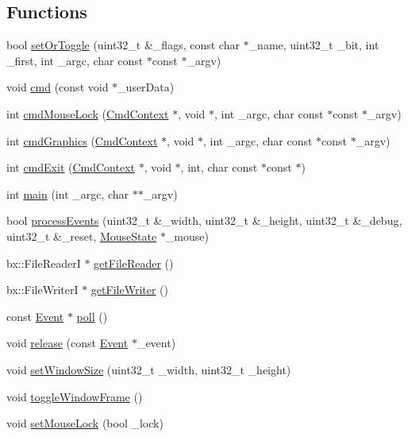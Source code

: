 \subsection*{Functions}
\begin{DoxyCompactItemize}
\item 
bool \hyperlink{namespaceentry_a64e500cbc02e0652e1c492d4eae7d2a2}{set\+Or\+Toggle} (uint32\+\_\+t \&\+\_\+flags, const char $\ast$\+\_\+name, uint32\+\_\+t \+\_\+bit, int \+\_\+first, int \+\_\+argc, char const $\ast$const $\ast$\+\_\+argv)
\item 
void \hyperlink{namespaceentry_af22e216eea3d98ca19a81c42687eee31}{cmd} (const void $\ast$\+\_\+user\+Data)
\item 
int \hyperlink{namespaceentry_a0ebf6dc9ef91f487ad56d260d0a3c5fb}{cmd\+Mouse\+Lock} (\hyperlink{struct_cmd_context}{Cmd\+Context} $\ast$, void $\ast$, int \+\_\+argc, char const $\ast$const $\ast$\+\_\+argv)
\item 
int \hyperlink{namespaceentry_a0daa467a5fde69bd7306a4bf7a621634}{cmd\+Graphics} (\hyperlink{struct_cmd_context}{Cmd\+Context} $\ast$, void $\ast$, int \+\_\+argc, char const $\ast$const $\ast$\+\_\+argv)
\item 
int \hyperlink{namespaceentry_a046e1eec8b8c1652b1a8eeec9f7b1d85}{cmd\+Exit} (\hyperlink{struct_cmd_context}{Cmd\+Context} $\ast$, void $\ast$, int, char const $\ast$const $\ast$)
\item 
int \hyperlink{namespaceentry_af1d986714ae748fb0b3b96b3af66ec63}{main} (int \+\_\+argc, char $\ast$$\ast$\+\_\+argv)
\item 
bool \hyperlink{namespaceentry_ac7854966247943ae0e4d104628c85de8}{process\+Events} (uint32\+\_\+t \&\+\_\+width, uint32\+\_\+t \&\+\_\+height, uint32\+\_\+t \&\+\_\+debug, uint32\+\_\+t \&\+\_\+reset, \hyperlink{structentry_1_1_mouse_state}{Mouse\+State} $\ast$\+\_\+mouse)
\item 
bx\+::\+File\+Reader\+I $\ast$ \hyperlink{namespaceentry_ad38197a50461fbbb1f920bd1da6a806b}{get\+File\+Reader} ()
\item 
bx\+::\+File\+Writer\+I $\ast$ \hyperlink{namespaceentry_a564287d7ab5a05538de9884d7d21a332}{get\+File\+Writer} ()
\item 
const \hyperlink{structentry_1_1_event}{Event} $\ast$ \hyperlink{namespaceentry_a8675f5da63bf76972fc3b0387ee32c42}{poll} ()
\item 
void \hyperlink{namespaceentry_a52ca9ce82cbf661be5b3255ad18605fd}{release} (const \hyperlink{structentry_1_1_event}{Event} $\ast$\+\_\+event)
\item 
void \hyperlink{namespaceentry_afd1d3b44324599bc7627c433146ec82b}{set\+Window\+Size} (uint32\+\_\+t \+\_\+width, uint32\+\_\+t \+\_\+height)
\item 
void \hyperlink{namespaceentry_a0bf80684c61fab67431f0441c5405a39}{toggle\+Window\+Frame} ()
\item 
void \hyperlink{namespaceentry_ad0e6572af7dd4ba198d1e03bd12984c1}{set\+Mouse\+Lock} (bool \+\_\+lock)
\end{DoxyCompactItemize}


